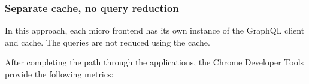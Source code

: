 \documentclass[MSE,Master,english]{twbook}%
\begin{document}
\fi

\subsubsection{Separate cache, no query reduction}

In this approach, each micro frontend has its own instance of the GraphQL client and cache. The queries are not reduced using the cache.

After completing the path through the applications, the Chrome Developer Tools provide the following metrics:
\end{document}
